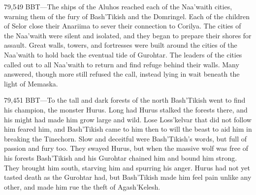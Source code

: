 \documentclass[smalldemyvopaper,11pt,twoside,onecolumn,openright,extrafontsizes]{memoir}
\begin{document}
79,549 BBT—The ships of the Aluhos reached each of the Naa’waith cities, warning them of the fury of Bash’Tikish and the Domringel. Each of the children of Selor close their Anariima to sever their connection to Corilya. The cities of the Naa’waith were silent and isolated, and they began to prepare their shores for assault. Great walls, towers, and fortresses were built around the cities of the Naa’waith to hold back the eventual tide of Gurohtar. The leaders of the cities called out to all Naa’waith to return and find refuge behind their walls. Many answered, though more still refused the call, instead lying in wait beneath the light of Memaska.

79,451 BBT—To the tall and dark forests of the north Bash’Tikish went to find his champion, the monster Hurus. Long had Hurus stalked the forests there, and his might had made him grow large and wild. Lose Loss’kelvar that did not follow him feared him, and Bash’Tikish came to him then to will the beast to aid him in breaking the Tinechorn. Slow and deceitful were Bash’Tikish’s words, but full of passion and fury too. They swayed Hurus, but when the massive wolf was free of his forests Bash’Tikish and his Gurohtar chained him and bound him strong. They brought him south, starving him and spurring his anger. Hurus had not yet tasted death as the Gurohtar had, but Bash’Tikish made him feel pain unlike any other, and made him rue the theft of Agash’Kelesh.
\end{document}
